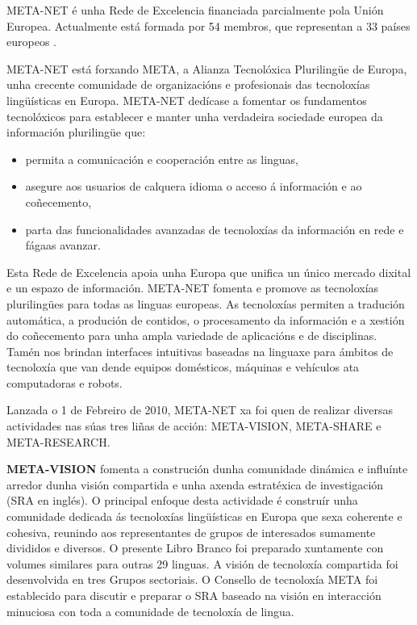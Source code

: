 \begin{multicols}{2}

META-NET é unha Rede de Excelencia financiada parcialmente  pola Unión Europea. Actualmente está formada por 54 membros, que representan a 33 países europeos \cite{rehm2011}.
   
META-NET está forxando META, a Alianza Tecnolóxica Plurilingüe de Europa, unha crecente comunidade de organizacións e profesionais das tecnoloxías lingüísticas en Europa. META-NET dedícase a fomentar os fundamentos tecnolóxicos para establecer e manter unha verdadeira sociedade europea da información plurilingüe que:

\begin{itemize}
	\item permita a comunicación e cooperación entre as linguas, 
	\item asegure aos usuarios de calquera idioma o acceso á información e ao coñecemento,
	\item parta das funcionalidades avanzadas de tecnoloxías da información en rede e fágaas avanzar. 
\end{itemize}

 Esta Rede de Excelencia apoia unha Europa que unifica un único mercado dixital e un espazo de información. META-NET fomenta e promove as tecnoloxías plurilingües para todas as linguas europeas. As tecnoloxías permiten a tradución automática, a produción de contidos, o procesamento da información e a xestión do coñecemento para unha ampla variedade de aplicacións e de disciplinas. Tamén nos brindan interfaces intuitivas baseadas na linguaxe para ámbitos de tecnoloxía que van dende equipos domésticos, máquinas e vehículos ata computadoras e robots. 

Lanzada o 1 de Febreiro de 2010, META-NET xa foi quen de realizar diversas actividades nas súas tres liñas de acción: META-VISION, META-SHARE  e  META-RESEARCH.

\textbf{META-VISION} fomenta a construción dunha comunidade dinámica e influínte arredor dunha visión compartida e unha axenda estratéxica de investigación (SRA en inglés). O principal enfoque desta actividade é construír unha comunidade dedicada ás tecnoloxías lingüísticas en Europa que sexa coherente e cohesiva, reunindo aos representantes de grupos de interesados sumamente divididos e diversos. O presente Libro Branco foi preparado xuntamente con volumes similares para outras 29 linguas. A visión de tecnoloxía compartida foi desenvolvida en tres Grupos  sectoriais. O Consello de tecnoloxía META foi establecido para discutir e preparar o SRA baseado na visión en interacción minuciosa con toda a  comunidade de tecnoloxía de lingua.


\end{multicols}
